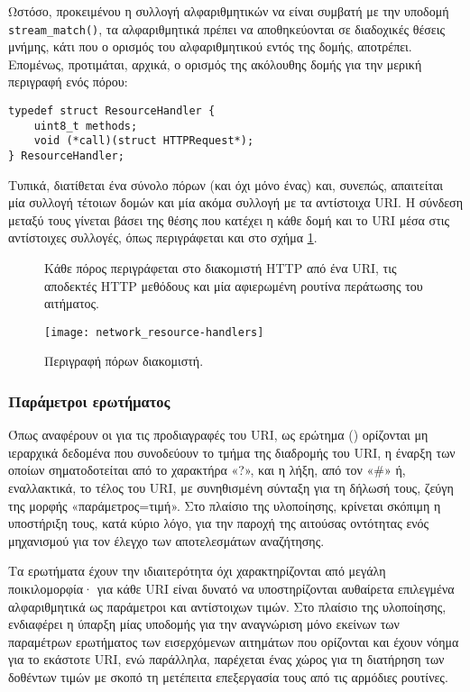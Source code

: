 Ωστόσο, προκειμένου η συλλογή αλφαριθμητικών να είναι συμβατή με την υποδομή
\verb~stream_match()~, τα αλφαριθμητικά πρέπει να αποθηκεύονται σε διαδοχικές
θέσεις μνήμης, κάτι που ο ορισμός του αλφαριθμητικού εντός της δομής, αποτρέπει.
Επομένως, προτιμάται, αρχικά, ο ορισμός της ακόλουθης δομής για την μερική
περιγραφή ενός πόρου:
\begin{lstlisting}
typedef struct ResourceHandler {
    uint8_t methods;
    void (*call)(struct HTTPRequest*);
} ResourceHandler;
\end{lstlisting}
Τυπικά, διατίθεται ένα σύνολο πόρων (και όχι μόνο ένας) και, συνεπώς, απαιτείται
μία συλλογή τέτοιων δομών και μία ακόμα συλλογή με τα αντίστοιχα URI. Η σύνδεση
μεταξύ τους γίνεται βάσει της θέσης που κατέχει η κάθε δομή και το URI μέσα στις
αντίστοιχες συλλογές, όπως περιγράφεται και στο σχήμα
\ref{fig:network:resource-handlers}.

\begin{figure}
    \caption{Περιγραφή πόρων διακομιστή.
    \label{fig:network:resource-handlers}}
    Κάθε πόρος περιγράφεται στο διακομιστή HTTP από ένα URI, τις αποδεκτές HTTP
    μεθόδους και μία αφιερωμένη ρουτίνα περάτωσης του αιτήματος.
    \begin{center}
    \texttt{[image: network\_resource-handlers]}
    \end{center}
\end{figure}


\subsubsection{Παράμετροι ερωτήματος}
\label{ssubsec:network:query-string}

Όπως αναφέρουν οι \textcite[23--24]{rfc3986} για τις προδιαγραφές του URI, ως
ερώτημα () ορίζονται μη ιεραρχικά δεδομένα που συνοδεύουν το τμήμα της
διαδρομής του URI, η έναρξη των οποίων σηματοδοτείται από το χαρακτήρα «?», και
η λήξη, από τον «\#» ή, εναλλακτικά, το τέλος του URI, με συνηθισμένη σύνταξη
για τη δήλωσή τους, ζεύγη της μορφής «παράμετρος=τιμή». Στο πλαίσιο της
υλοποίησης, κρίνεται σκόπιμη η υποστήριξη τους, κατά κύριο λόγο, για την παροχή
της αιτούσας οντότητας ενός μηχανισμού για τον έλεγχο των αποτελεσμάτων
αναζήτησης.

Τα ερωτήματα έχουν την ιδιαιτερότητα όχι χαρακτηρίζονται από μεγάλη
ποικιλομορφία· για κάθε URI είναι δυνατό να υποστηρίζονται αυθαίρετα επιλεγμένα
αλφαριθμητικά ως παράμετροι και αντίστοιχων τιμών. Στο πλαίσιο της υλοποίησης,
ενδιαφέρει η ύπαρξη μίας υποδομής για την αναγνώριση μόνο εκείνων των παραμέτρων
ερωτήματος των εισερχόμενων αιτημάτων που ορίζονται και έχουν νόημα για το
εκάστοτε URI, ενώ παράλληλα, παρέχεται ένας χώρος για τη διατήρηση των δοθέντων
τιμών με σκοπό τη μετέπειτα επεξεργασία τους από τις αρμόδιες ρουτίνες.


